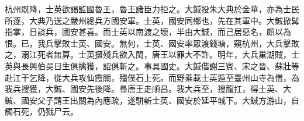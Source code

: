 \begin{pinyinscope}
杭州既降，士英欲謁監國魯王，魯王諸臣力拒之。大鋮投朱大典於金華，亦為士民所逐，大典乃送之嚴州總兵方國安軍。士英，國安同鄉也，先在其軍中。大鋮掀髯指掌，日談兵，國安甚喜。而士英以南渡之壞，半由大鋮，而己居惡名，頗以為恨。已，我兵擊敗士英、國安。無何，士英、國安率眾渡錢塘，窺杭州，大兵擊敗之，溺江死者無算。士英擁殘兵欲入閩，唐王以罪大不許。明年，大兵巢湖賊，士英與長興伯吳日生俱擒獲，詔俱斬之。事具國史。大鋮偕謝三賓、宋之晉、蘇壯等赴江干乞降，從大兵攻仙霞關，殭僕石上死。而野乘載士英遁至臺州山寺為僧，為我兵搜獲，大鋮、國安先後降。尋唐王走順昌。我大兵至，搜龍扛，得士英、大鋮、國安父子請王出關為內應疏，遂駢斬士英、國安於延平城下。大鋮方游山，自觸石死，仍戮尸云。


\end{pinyinscope}